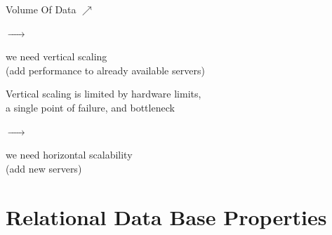 \documentclass{report}
\begin{document}
\begin{minipage}[t]{0.4\textwidth}
\centering
Volume Of Data $\nearrow$ 
\end{minipage}
\hfill 
$\xrightarrow{\hspace{1cm}}$
\hfill 
\begin{minipage}[t]{0.45\textwidth}
we need vertical scaling \\[0.1cm](add performance to already available servers)
\end{minipage}

\vspace{1cm}


\begin{minipage}[t]{0.4\textwidth}
\centering
Vertical scaling is limited by hardware limits, \\[0.1cm]a single point of failure, and bottleneck
\end{minipage}
\hfill
$\xrightarrow{\hspace{1cm}}$
\hfill 
\begin{minipage}{0.45\textwidth}
we need horizontal scalability \\[0.1cm](add new servers) 
\end{minipage}


\vspace{1cm}
\section{Relational Data Base Properties}

\vspace{.5cm}

\begin{center}
\end{center}
\end{document}
